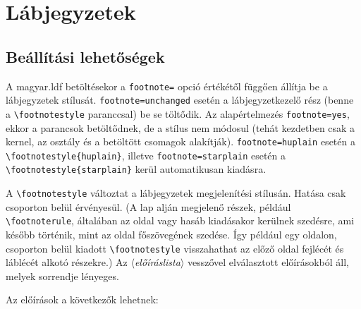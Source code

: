 \documentclass[12pt]{article}
\newcommand\param[1]{{\normalfont\slshape$\langle$#1$\rangle$}}
\begin{document}
\section{Lábjegyzetek}\label{sec-labjegyzet}

\subsection{Beállítási lehetőségek}

\begin{latexcode}
\footnotestyle{(*\param{előíráslista}*)}
\end{latexcode}
A \textsf{magyar.ldf} betöltésekor a \texttt{footnote=} opció értékétől függően állítja be a lábjegyzetek stílusát.
\texttt{footnote=unchanged} esetén a lábjegyzetkezelő rész (benne a \verb|\footnotestyle| paranccsal) be se töltődik.
Az alapértelmezés \texttt{footnote=yes}, ekkor a parancsok betöltődnek, de a stílus nem módosul (tehát kezdetben csak a kernel, az osztály és a betöltött csomagok alakítják).
\texttt{footnote=huplain} esetén a \verb|\footnotestyle{huplain}|, illetve \texttt{footnote=starplain} esetén a \verb|\footnotestyle{starplain}| kerül automatikusan kiadásra.

A \verb|\footnotestyle| változtat a lábjegyzetek megjelenítési stílusán.
Hatása csak csoporton belül érvényesül. 
(A lap alján megjelenő részek, például \verb|\footnoterule|, általában az oldal vagy hasáb kiadásakor kerülnek szedésre, ami később történik, mint az oldal főszövegének szedése.
Így például egy oldalon, csoporton belül kiadott \verb|\footnotestyle| visszahathat az előző oldal fejlécét és láblécét alkotó részekre.)
Az \param{előíráslista} vesszővel elválasztott előírásokból áll, melyek sorrendje lényeges.

\medskip
Az előírások a következők lehetnek:
\end{document}
